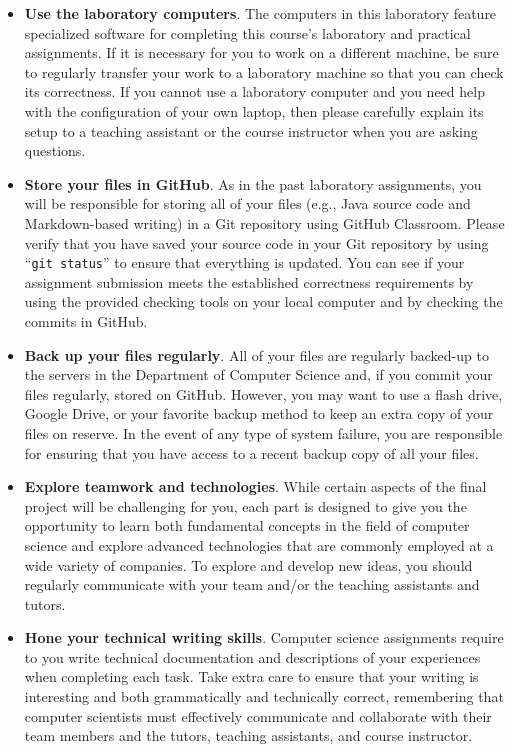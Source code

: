 \documentclass[11pt]{article}
\newcommand{\command}[1]{``\lstinline{#1}''}
\begin{document}
\begin{itemize}
  \setlength{\itemsep}{0pt}

\item {\bf Use the laboratory computers}. The computers in this laboratory feature specialized software for completing
  this course's laboratory and practical assignments. If it is necessary for you to work on a different machine, be sure
  to regularly transfer your work to a laboratory machine so that you can check its correctness. If you cannot use a
  laboratory computer and you need help with the configuration of your own laptop, then please carefully explain its
  setup to a teaching assistant or the course instructor when you are asking questions.

\item {\bf Store your files in GitHub}. As in the past laboratory assignments, you will be responsible for storing all
  of your files (e.g., Java source code and Markdown-based writing) in a Git repository using GitHub Classroom. Please
  verify that you have saved your source code in your Git repository by using \command{git status} to ensure that
  everything is updated. You can see if your assignment submission meets the established correctness requirements by
  using the provided checking tools on your local computer and by checking the commits in GitHub.

\item {\bf Back up your files regularly}. All of your files are regularly backed-up to the servers in the Department of
  Computer Science and, if you commit your files regularly, stored on GitHub. However, you may want to use a flash
  drive, Google Drive, or your favorite backup method to keep an extra copy of your files on reserve. In the event of
  any type of system failure, you are responsible for ensuring that you have access to a recent backup copy of all your
  files.

\item {\bf Explore teamwork and technologies}. While certain aspects of the
  final project will be challenging for you, each part is designed to give you
  the opportunity to learn both fundamental concepts in the field of computer
  science and explore advanced technologies that are commonly employed at a wide
  variety of companies. To explore and develop new ideas, you should regularly
  communicate with your team and/or the teaching assistants and tutors.

\item {\bf Hone your technical writing skills}. Computer science assignments
  require to you write technical documentation and descriptions of your
  experiences when completing each task. Take extra care to ensure that your
  writing is interesting and both grammatically and technically correct,
  remembering that computer scientists must effectively communicate and
  collaborate with their team members and the tutors, teaching assistants, and
  course instructor.


\end{itemize}
\end{document}
